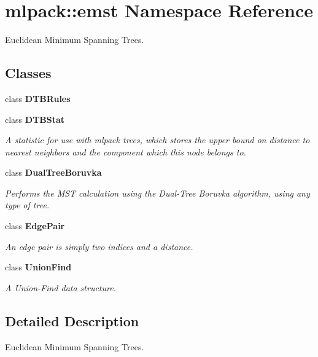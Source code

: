\section{mlpack\+:\+:emst Namespace Reference}
\label{namespacemlpack_1_1emst}


Euclidean Minimum Spanning Trees.  


\subsection*{Classes}
\begin{DoxyCompactItemize}
\item 
class \textbf{ D\+T\+B\+Rules}
\item 
class \textbf{ D\+T\+B\+Stat}
\begin{DoxyCompactList}\small\item\em A statistic for use with mlpack trees, which stores the upper bound on distance to nearest neighbors and the component which this node belongs to. \end{DoxyCompactList}\item 
class \textbf{ Dual\+Tree\+Boruvka}
\begin{DoxyCompactList}\small\item\em Performs the M\+ST calculation using the Dual-\/\+Tree Boruvka algorithm, using any type of tree. \end{DoxyCompactList}\item 
class \textbf{ Edge\+Pair}
\begin{DoxyCompactList}\small\item\em An edge pair is simply two indices and a distance. \end{DoxyCompactList}\item 
class \textbf{ Union\+Find}
\begin{DoxyCompactList}\small\item\em A Union-\/\+Find data structure. \end{DoxyCompactList}\end{DoxyCompactItemize}


\subsection{Detailed Description}
Euclidean Minimum Spanning Trees. 

